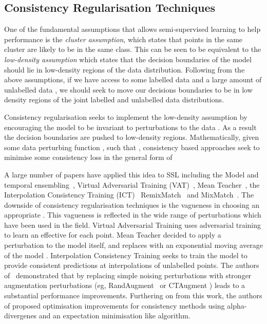 \documentclass[journal]{IEEEtran}
\begin{document}
\subsection{Consistency Regularisation Techniques} 

One of the fundamental assumptions that allows semi-supervised learning to help performance is the \textit{cluster assumption}, which states that points in the same cluster are likely to be in the same class. This can be seen to be equivalent to the \textit{low-density assumption} which states that the decision boundaries of the model should lie in low-density regions of the data distribution.  Following from the above assumptions, if we have access to some labelled data  and a large amount of unlabelled data , we should seek to move our decisions boundaries to be in low density regions of the joint labelled and unlabelled data distributions. 



Consistency regularisation seeks to implement the low-density assumption by encouraging the model  to be invariant to perturbations  to the data . As a result the decision boundaries are pushed to low-density regions. Mathematically, given some data perturbing function , such that , consistency based approaches seek to minimise some consistency loss  in the general form of 



A large number of papers have applied this idea to SSL including the Model and temporal ensembling~\cite{laine2016temporal}, Virtual Adversarial Training (VAT)~\cite{miyato2018virtual}, Mean Teacher~\cite{tarvainen2017mean}, the Interpolation Consistency Training (ICT)~\cite{verma2019interpolation} RemixMatch~\cite{remixmatch} and MixMatch~\cite{berthelot2019mixmatch}. The downside of consistency regularisation techniques is the vagueness in choosing an appropriate . This vagueness is reflected in the wide range of perturbations which have been used in the field. Virtual Adversarial Training uses adversarial training to learn an effective  for each point. Mean Teacher \cite{tarvainen2017mean} decided to apply a perturbation to the model itself, and replaces  with an exponential moving average of the model . Interpolation Consistency Training \cite{verma2019interpolation} seeks to train the model to provide consistent predictions at interpolations of unlabelled points. The authors of~\cite{xie2019unsupervised} demonstrated that by replacing simple noising perturbations with stronger augmentation perturbations (eg, RandAugment~\cite{cubuk2020randaugment} or CTAugment \cite{remixmatch}) leads to a substantial performance improvements. Furthering on from this work, the authors of \cite{gong2021alphamatch} proposed optimisation improvements for consistency methods using alpha-divergenes and an expectation minimisation like algorithm.
\end{document}
